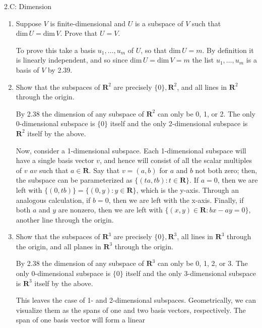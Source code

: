 \documentclass{book}
\begin{document}
2.C: Dimension

\begin{enumerate}

\item Suppose \(V\) is finite-dimensional and \(U\) is a subspace of \(V\) such that \(\textrm{dim} \, U=\textrm{dim} \, V\).  Prove that \(U=V\).

To prove this take a basis \(u_1,\dots,u_m\) of \(U\), so that \(\textrm{dim} \, U=m\).  By definition it is linearly independent, and so since \(\textrm{dim} \, U=\textrm{dim} \, V=m\) the list \(u_1,\dots,u_m\) is a basis of \(V\) by 2.39.

\item Show that the subspaces of \(\textbf{R}^2\) are precisely \(\{0\}, \textbf{R}^2\), and all lines in \(\textbf{R}^2\) through the origin.

By 2.38 the dimension of any subspace of \(\textbf{R}^2\) can only be 0, 1, or 2.  The only 0-dimensional subspace is \(\{0\}\) itself and the only 2-dimensional subspace is \(\textbf{R}^2\) itself by the above.

Now, consider a 1-dimensional subspace.  Each 1-dimensional subspace will have a single basis vector \(v\), and hence will consist of all the scalar multiples of \(v\) \(av\) such that \(a \in \textbf{R}\).  Say that \(v = (a,b)\) for \(a\) and \(b\) not both zero; then, the subspace can be parameterized as \(\{(ta,tb): t \in \textbf{R}\}\).  If \(a=0\), then we are left with \(\{(0,tb)\}=\{(0,y):y \in \textbf{R}\}\), which is the y-axis.  Through an analogous calculation, if \(b=0\), then we are left with the x-axis.  Finally, if both \(a\) and \(y\) are nonzero, then we are left with \(\{(x,y) \in \textbf{R}:bx-ay=0\}\), another line through the origin.

\item Show that the subspaces of \(\textbf{R}^3\) are precisely \(\{0\}, \textbf{R}^3\), all lines in \(\textbf{R}^3\) through the origin, and all planes in \(\textbf{R}^3\) through the origin.

By 2.38 the dimension of any subspace of \(\textbf{R}^3\) can only be 0, 1, 2, or 3.  The only 0-dimensional subspace is \(\{0\}\) itself and the only 3-dimensional subspace is \(\textbf{R}^3\) itself by the above.  

This leaves the case of 1- and 2-dimensional subspaces.  Geometrically, we can visualize them as the spans of one and two basis vectors, respectively.  The span of one basis vector will form a linear 


\end{enumerate}
\end{document}
